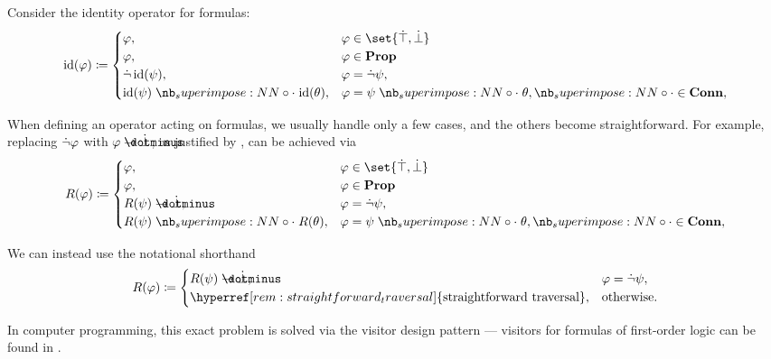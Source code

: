 \begin{remark}\label{rem:straightforward_traversal}
  Consider the identity operator for formulas:
  \begin{equation*}
    \begin{aligned}
      \id(\varphi) \coloneqq \begin{cases}
        \varphi,                        &\varphi \in \set{ \syntop, \synbot } \\
        \varphi,                        &\varphi \in \op*{Prop} \\
        \synneg \id(\psi),              &\varphi = \synneg \psi, \\
        \id(\psi) \syncirc \id(\theta), &\varphi = \psi \syncirc \theta, {\syncirc} \in \op*{Conn}, \\
      \end{cases}
    \end{aligned}
  \end{equation*}

  When defining an operator acting on formulas, we usually handle only a few cases, and the others become straightforward. For example, replacing \( \dot\neg \varphi \) with \( \varphi \synimplies \synbot \), as justified by , can be achieved via
  \begin{equation*}
    \begin{aligned}
      R(\varphi) \coloneqq \begin{cases}
        \varphi,                     &\varphi \in \set{ \syntop, \synbot } \\
        \varphi,                     &\varphi \in \op*{Prop} \\
        R(\psi) \synimplies \synbot, &\varphi = \synneg \psi, \\
        R(\psi) \syncirc R(\theta),  &\varphi = \psi \syncirc \theta, {\syncirc} \in \op*{Conn}, \\
      \end{cases}
    \end{aligned}
  \end{equation*}

  We can instead use the notational shorthand
  \begin{equation*}
    \begin{aligned}
      R(\varphi) \coloneqq \begin{cases}
        R(\psi) \synimplies \synbot,                                             &\varphi = \synneg \psi, \\
        \hyperref[rem:straightforward_traversal]{\T{straightforward traversal}}, &\T{otherwise.}
      \end{cases}
    \end{aligned}
  \end{equation*}

  In computer programming, this exact problem is solved via the visitor design pattern --- visitors for formulas of first-order logic can be found in \cite{code}.
\end{remark}

